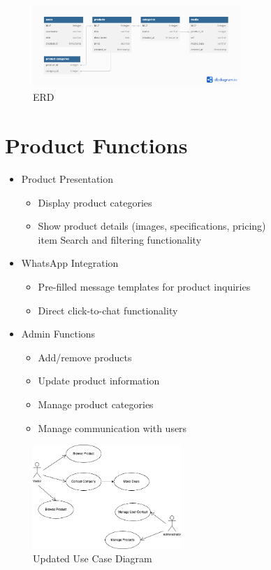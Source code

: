 \documentclass[oneside,a4paper,12pt,explicit]{book}
\begin{document}
\begin{figure}[H]
    \centering
    \includegraphics[width=0.7\textwidth]{img/erdSRSMRPL.png}
    \caption{ERD}
    \label{fig:erd}
\end{figure}

\section{Product Functions}
\begin{itemize}
    \item Product Presentation
    \begin{itemize}
        \item Display product categories
        \item Show product details (images, specifications, pricing)
        \\item Search and filtering functionality
    \end{itemize}
    
    \item WhatsApp Integration
    \begin{itemize}
        \item Pre-filled message templates for product inquiries
        \item Direct click-to-chat functionality
    \end{itemize}
    
    \item Admin Functions
    \begin{itemize}
        \item Add/remove products
        \item Update product information
        \item Manage product categories
        \item Manage communication with users
    \end{itemize}
\end{itemize}

\begin{figure}[H]
    \centering
    \includegraphics[width=0.5\textwidth]{img/usecaseSRS.png}
    \caption{Updated Use Case Diagram}
    \label{fig:usecase}
\end{figure}
\end{document}

